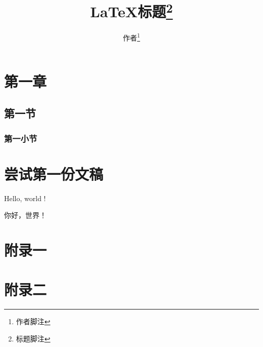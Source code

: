 \documentclass[twoside]{ctexart}
\title{\LaTeX{}标题\thanks{标题脚注}}
\author{作者\thanks{作者脚注}}
\date{}
\begin{document}
\maketitle


\tableofcontents
\listoffigures
\listoftables

\section{第一章}
    \subsection{第一节}
        \subsubsection{第一小节}

\section{尝试第一份文稿}
		    Hello, world ! 

		    你好，世界！

\theendnotes

\begin{appendices}
    \section{附录一}
    \section{附录二}
\end{appendices}
\end{document}
